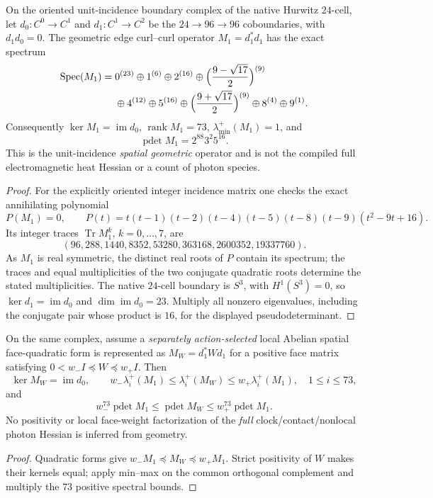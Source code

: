 \documentclass[12pt,a4paper]{article}
\begin{document}
\begin{theorem}
\label{p10:thm:v340-s3lit-hurwitz-edge-spectrum}
On the oriented unit-incidence boundary complex of the native Hurwitz
$24$-cell, let $d_0:C^0\to C^1$ and $d_1:C^1\to C^2$ be the
$24\to96\to96$ coboundaries, with $d_1d_0=0$.  The geometric edge
curl--curl operator $M_1=d_1^*d_1$ has the exact spectrum
\[
\begin{split}
 \operatorname{Spec}(M_1)={}&0^{(23)}\oplus1^{(6)}\oplus2^{(16)}
 \oplus\Bigl(\frac{9-\sqrt{17}}2\Bigr)^{(9)}\\
 &\oplus4^{(12)}\oplus5^{(16)}
 \oplus\Bigl(\frac{9+\sqrt{17}}2\Bigr)^{(9)}
 \oplus8^{(4)}\oplus9^{(1)}.
\end{split}
\]
Consequently $\ker M_1=\operatorname{im}d_0$,
$\operatorname{rank}M_1=73$, $\lambda_{\min}^+(M_1)=1$, and
\[
 \operatorname{pdet}M_1=2^{88}3^2 5^{16}.
\]
This is the unit-incidence \emph{spatial geometric} operator and is not
the compiled full electromagnetic heat Hessian or a count of photon species.
\end{theorem}
\begin{proof}
For the explicitly oriented integer incidence matrix one checks the
exact annihilating polynomial
\[
 P(M_1)=0,\qquad
 P(t)=t(t-1)(t-2)(t-4)(t-5)(t-8)(t-9)(t^2-9t+16).
\]
Its integer traces $\operatorname{Tr}M_1^k$, $k=0,\ldots,7$, are
\[
 (96,288,1440,8352,53280,363168,2600352,19337760).
\]
As $M_1$ is real symmetric, the distinct real roots of $P$ contain its
spectrum; the traces and equal multiplicities of the two conjugate
quadratic roots determine the stated multiplicities.  The native
$24$-cell boundary is $S^3$, with $H^1(S^3)=0$, so
$\ker d_1=\operatorname{im}d_0$ and $\dim\operatorname{im}d_0=23$.
Multiply all nonzero eigenvalues, including the conjugate pair whose
product is $16$, for the displayed pseudodeterminant.
\end{proof}

\begin{corollary}
\label{p10:cor:v340-s3lit-weighted-face-bound}
On the same complex, assume a \emph{separately action-selected} local
Abelian spatial face-quadratic form is represented as
$M_W=d_1^*Wd_1$ for a positive face matrix satisfying
$0<w_-I\preceq W\preceq w_+I$.  Then
\[
 \ker M_W=\operatorname{im}d_0,\qquad
 w_-\lambda_i^+(M_1)\le\lambda_i^+(M_W)
 \le w_+\lambda_i^+(M_1),\quad 1\le i\le73,
\]
and
\[
 w_-^{73}\operatorname{pdet}M_1\le
 \operatorname{pdet}M_W\le
 w_+^{73}\operatorname{pdet}M_1.
\]
No positivity or local face-weight factorization of the \emph{full}
clock/contact/nonlocal photon Hessian is inferred from geometry.
\end{corollary}
\begin{proof}
Quadratic forms give $w_-M_1\preceq M_W\preceq w_+M_1$.
Strict positivity of $W$ makes their kernels equal; apply min--max
on the common orthogonal complement and multiply the $73$ positive
spectral bounds.
\end{proof}
\end{document}
